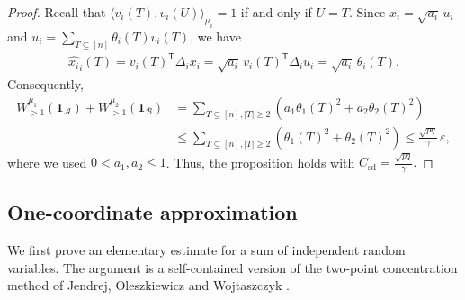 \documentclass[11pt]{article}
\numberwithin{equation}{section}
\theoremstyle{definition}
\theoremstyle{remark}
\begin{document}
\begin{proof}
Recall that $\langle v_i(T),v_i(U)\rangle_{\mu_i} =1$ if and only if $U=T$.
Since $x_i=\sqrt{a_i}\,u_i$ and  $
 u_i=\sum_{T\subseteq[n]}\theta_i(T)v_i(T)$,
we have
$$
\begin{aligned}
 \widehat{x_i}_i(T)
 =
 v_i(T)^{\mathsf T}\Delta_i x_i=
 \sqrt{a_i}\,
 v_i(T)^{\mathsf T}\Delta_i u_i=
 \sqrt{a_i}\,\theta_i(T).
\end{aligned}
$$
Consequently,
$$
\begin{aligned}
 W_{>1}^{\mu_1}(\mathbf 1_{\mathcal A})
 +W_{>1}^{\mu_2}(\mathbf 1_{\mathcal B})
 &=
 \sum_{T\subseteq[n], |T|\geq2}
 \left(
  a_1\theta_1(T)^2+a_2\theta_2(T)^2
 \right)\\
 &\leq
 \sum_{T\subseteq[n], |T|\geq2}
 \left(
  \theta_1(T)^2+\theta_2(T)^2
 \right)\leq
 \frac{\sqrt{pq}}{\gamma}\,\varepsilon,
\end{aligned}
$$
where we used $0<a_1,a_2\leq1$. Thus, the proposition holds with
$
 C_{\mathrm{sd}}=\frac{\sqrt{pq}}{\gamma}.
$
\end{proof}



\subsection{One-coordinate approximation}

We first prove an elementary estimate for a sum of independent random
variables.  The argument is a self-contained version of the two-point
concentration method of Jendrej, Oleszkiewicz and Wojtaszczyk
\cite{JendrejOleszkiewiczWojtaszczyk}.
\end{document}
